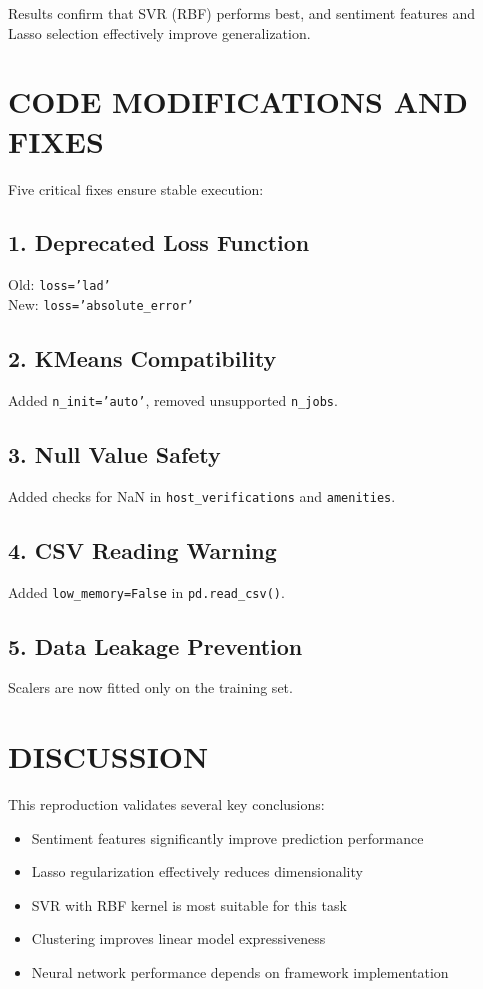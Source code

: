 \documentclass[11pt,a4paper]{article}
\begin{document}
Results confirm that SVR (RBF) performs best, and sentiment features and Lasso selection effectively improve generalization.

\section{CODE MODIFICATIONS AND FIXES}
Five critical fixes ensure stable execution:

\subsection{1. Deprecated Loss Function}
Old: \texttt{loss='lad'} \\
New: \texttt{loss='absolute\_error'}

\subsection{2. KMeans Compatibility}
Added \texttt{n\_init='auto'}, removed unsupported \texttt{n\_jobs}.

\subsection{3. Null Value Safety}
Added checks for NaN in \texttt{host\_verifications} and \texttt{amenities}.

\subsection{4. CSV Reading Warning}
Added \texttt{low\_memory=False} in \texttt{pd.read\_csv()}.

\subsection{5. Data Leakage Prevention}
Scalers are now fitted only on the training set.

\section{DISCUSSION}
This reproduction validates several key conclusions:
\begin{itemize}
    \item Sentiment features significantly improve prediction performance
    \item Lasso regularization effectively reduces dimensionality
    \item SVR with RBF kernel is most suitable for this task
    \item Clustering improves linear model expressiveness
    \item Neural network performance depends on framework implementation
\end{itemize}
\end{document}
